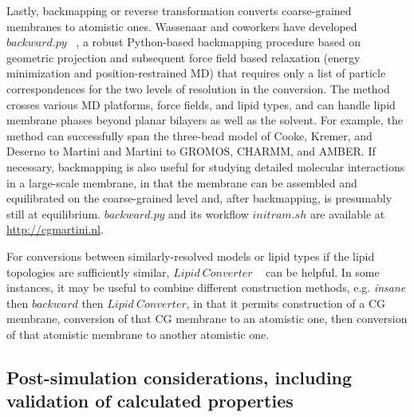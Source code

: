 \documentclass[9pt,bestpractices,pubversion]{livecoms}
\begin{document}
Lastly, backmapping or reverse transformation converts coarse-grained membranes to atomistic ones.
Wassenaar and coworkers have developed $backward.py$ ~\cite{Wassenaar2014}, a robust Python-based backmapping procedure based on geometric projection and subsequent force field based relaxation (energy minimization and position-restrained MD) that requires only a list of particle correspondences for the two levels of resolution in the conversion.
The method crosses various MD platforms, force fields, and lipid types, and can handle lipid membrane phases beyond planar bilayers as well as the solvent.
For example, the method can successfully span the three-bead model of Cooke, Kremer, and Deserno to Martini and Martini to GROMOS, CHARMM, and AMBER.
If necessary, backmapping is also useful for studying detailed molecular interactions in a large-scale membrane, in that the membrane can be assembled and equilibrated on the coarse-grained level and, after backmapping, is presumably still at equilibrium.
$backward.py$ and its workflow $initram.sh$ are available at \url{http://cgmartini.nl}.

\begin{center}
\begin{minipage}{\columnwidth}
\hspace*{4mm} For conversions between similarly-resolved models or lipid types if the lipid topologies are sufficiently similar, $Lipid\ Converter$ ~\cite{Larsson2014} can be helpful.
In some instances, it may be useful to combine different construction methods, e.g. \textit{insane} then $backward$ then $Lipid\ Converter$, in that it permits construction of a CG membrane, conversion of that CG membrane to an atomistic one, then conversion of that atomistic membrane to another atomistic one.%
\end{minipage}
\end{center}

\subsection{Post-simulation considerations, including validation of calculated properties}
\label{subsec:postsim4}
\end{document}

